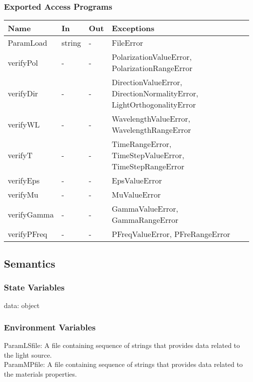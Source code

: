 \documentclass[12pt, titlepage]{article}
\begin{document}
\subsubsection{Exported Access Programs}

\begin{center}
	\begin{tabular}{p{3cm} p{2cm} p{2cm} p{6cm}}
		\hline
		\textbf{Name} & \textbf{In} & \textbf{Out} & \textbf{Exceptions} \\
		\hline
		ParamLoad & string & - & FileError \\
		
		verifyPol & - & - & PolarizationValueError, PolarizationRangeError\\
		
		verifyDir & - & - & DirectionValueError, DirectionNormalityError, LightOrthogonalityError\\
		
		verifyWL & - & - & WavelengthValueError, WavelengthRangeError\\
		
		verifyT & - & - & TimeRangeError, TimeStepValueError, TimeStepRangeError\\
		
		verifyEps & - & - & EpsValueError\\
		
		verifyMu & - & - & MuValueError\\
		
		verifyGamma & - & - & GammaValueError, GammaRangeError\\
		
		verifyPFreq & - & - & PFreqValueError, PFreRangeError\\
	
		\hline
	\end{tabular}
\end{center}

\subsection{Semantics}

\subsubsection{State Variables}

data: object

\subsubsection{Environment Variables}
ParamLSfile: A file containing sequence of strings that provides data related to the light source. \\
ParamMPfile: A file containing sequence of strings that provides data related to the materials properties.
\end{document}
